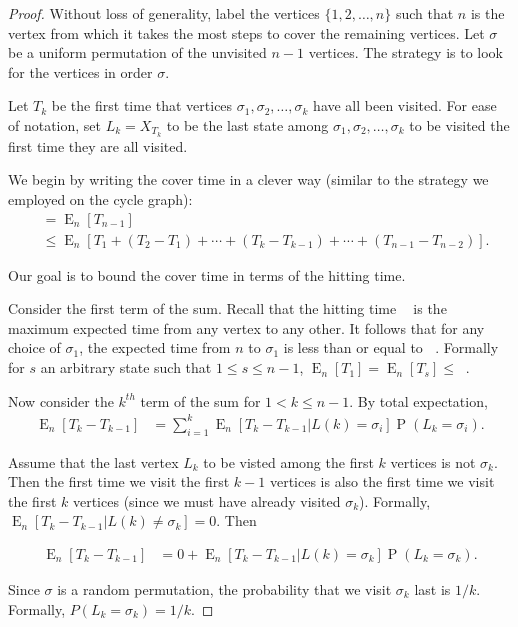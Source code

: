 \documentclass[12pt]{article}
\theoremstyle{definition}
\DeclareMathOperator{\E}{\mathrm{E}}		     %
\DeclareMathOperator{\pr}{\mathrm{P}}		     %
\DeclareMathOperator{\tcov}{t_\textrm{cov}}      %
\DeclareMathOperator{\hit}{t_{\textrm{hit}}}     %
\begin{document}
\begin{proof}
Without loss of generality, label the vertices $\{1, 2, \dots, n\}$
such that $n$ is the vertex from which it takes the most steps to cover
the remaining vertices.
Let $\sigma$ be a uniform permutation of the unvisited $n-1$ vertices.
The strategy is to look for the vertices in order $\sigma$.

Let $T_k$ be the first time that vertices $\sigma_1, \sigma_2, \ldots, \sigma_k$
have all been visited.
For ease of notation, set $L_k = X_{T_k}$ to be the last state among 
$\sigma_1, \sigma_2, \ldots, \sigma_k$ to be visited the first
time they are all visited.

We begin by writing the cover time in a clever way
(similar to the strategy we employed on the cycle graph):
\begin{align}
\tcov &= \E_n[{T_{n-1}}]  \nonumber \\
&\leq \E_n[T_1 + (T_2 - T_1) + \cdots + 
(T_k - T_{k-1}) + \cdots + (T_{n-1} - T_{n-2})] . \nonumber
\end{align}

Our goal is to bound the cover time in terms of the hitting time.

Consider the first term of the sum.
Recall that the hitting time $\hit$ is the maximum
expected time from any vertex to any other.
It follows that for any choice of $\sigma_1$,
the expected time from $n$ to $\sigma_1$ is less than or equal to $\hit$.
Formally for $s$ an arbitrary state such that $1\leq s \leq n-1$,
$\E_n[T_1] = \E_n[T_s] \leq \hit$.

Now consider the $k^{th}$ term of the sum for $1 < k \leq n-1$.
By total expectation,
\begin{align}
\E_n[T_k - T_{k-1}] &=
\sum_{i=1}^k \E_n[T_k - T_{k-1} | L(k) = \sigma_i]
\pr(L_k = \sigma_i). \nonumber 
\end{align}

Assume that the last vertex $L_k$ to be visted among the first
$k$ vertices is not $\sigma_k$.
Then the first time we visit the first $k-1$ vertices
is also the first time we visit the first $k$ vertices
(since we must have already visited $\sigma_k$).
Formally, $\E_n[T_k-T_{k-1}|L(k) \neq \sigma_k] = 0$.
Then 

\begin{align}
\E_n[T_k - T_{k-1}] &= 0 +
\E_n[T_k - T_{k-1} | L(k) = \sigma_k]
\pr(L_k = \sigma_k). \nonumber 
\end{align}

Since $\sigma$ is a random permutation, the probability that
we visit $\sigma_k$ last is $1/k$.
Formally, $P(L_k = \sigma_k) = 1/k$.


\end{proof}
\end{document}
